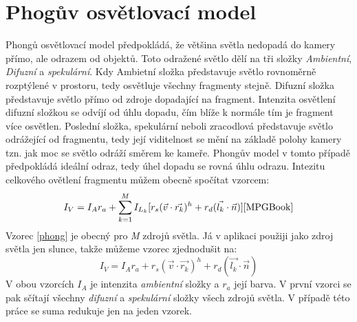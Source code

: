 \section{Phogův osvětlovací model}
Phongů osvětlovací model předpokládá, že většina světla nedopadá do kamery přímo, ale odrazem od objektů.
Toto odražené světlo dělí na tři složky \emph{Ambientní}, \emph{Difuzní} a \emph{spekulární}. Kdy Ambietní složka představuje světlo rovnoměrně rozptýlené v prostoru, tedy osvětluje všechny fragmenty stejně. Difuzní složka představuje světlo přímo od zdroje dopadající na fragment. Intenzita osvětlení difuzní složkou se odvíjí od úhlu dopadu, čím blíže k normále tím je fragment více osvětlen. Poslední složka, spekulární neboli zracodlová představuje světlo odrážející od fragmentu, tedy její viditelnost se mění na základě polohy kamery tzn. jak moc se světlo odráží směrem ke kameře. Phongův model v tomto případě předpokládá ideální odraz, tedy úhel dopadu se rovná  úhlu odrazu. Intezitu celkového ovětlení fragmentu můžem obecně spočítat vzorcem:
\begin{equation}\label{phong}
I_V = I_A r_a + \sum_{k=1}^{M}I_{L_k}[r_s(\vec{v}\cdot\vec{r_k})^h + r_d(\vec{l_k}\cdot\vec{n})]\cite{MPGBook}
\end{equation}
Vzorec \ref{phong} je obecný pro \emph{M} zdrojů světla. Já v aplikaci použiji jako zdroj světla jen slunce, takže můžeme vzorec zjednodušit na:
\begin{equation}\label{MyPhong}
I_V = I_A r_a + r_s(\vec{v}\cdot\vec{r_k})^h + r_d(\vec{l_k}\cdot\vec{n})
\end{equation}
 V obou vzorcích $ I_A $ je intenzita \emph{ambientní} složky a $r_a$ její barva. V první vzorci se pak sčítají všechny \emph{difuzní} a \emph{spekulární} složky všech zdrojů světla. V případě této práce se suma redukuje jen na jeden vzorek.

